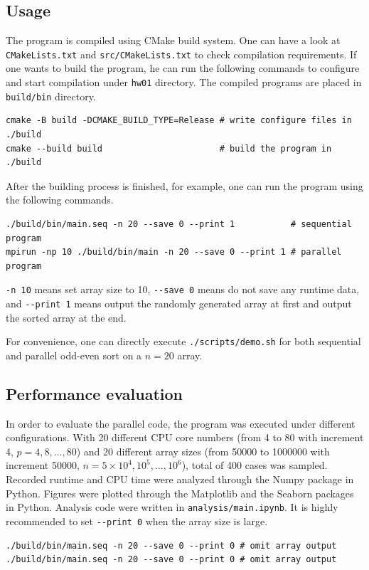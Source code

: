 \documentclass[twoside,12pt]{article}
\theoremstyle{definition}
\theoremstyle{remark}
\begin{document}
\subsection{Usage}
The program is compiled using CMake build system.
One can have a look at \lstinline|CMakeLists.txt| and \lstinline|src/CMakeLists.txt| 
to check compilation requirements.
If one wants to build the program, he can run the following commands to
configure and start compilation under \lstinline|hw01| directory.
The compiled programs are placed in \lstinline|build/bin| directory.
\begin{lstlisting}
cmake -B build -DCMAKE_BUILD_TYPE=Release # write configure files in ./build
cmake --build build                       # build the program in ./build
\end{lstlisting}
After the building process is finished, for example,
one can run the program using the following commands.
\begin{lstlisting}
./build/bin/main.seq -n 20 --save 0 --print 1           # sequential program
mpirun -np 10 ./build/bin/main -n 20 --save 0 --print 1 # parallel program 
\end{lstlisting}
\lstinline|-n 10| means set array size to 10, \lstinline|--save 0|
means do not save any runtime data, and \lstinline|--print 1|
means output the randomly generated array at first and output
the sorted array at the end.

For convenience, one can directly execute \lstinline|./scripts/demo.sh|
for both sequential and parallel odd-even sort on a $n=20$ array.


\subsection{Performance evaluation}
In order to evaluate the parallel code, the program was executed under 
different configurations.
With 20 different CPU core numbers (from 4 to 80 with increment 4, $p=4, 8,\dots, 80$)
and 20 different array sizes (from 50000 to 1000000 with increment 50000, $n=5\times 10^4, 10^5, \dots, 10^6$), 
total of 400 cases was sampled.
Recorded runtime and CPU time were analyzed through the Numpy
package in Python.
Figures were plotted through the Matplotlib and the Seaborn packages in Python.
Analysis code were written in \lstinline|analysis/main.ipynb|.
It is highly recommended to set \lstinline|--print 0| when the array size is large.
\begin{lstlisting}
./build/bin/main.seq -n 20 --save 0 --print 0 # omit array output
./build/bin/main.seq -n 20 --save 0 --print 0 # omit array output
\end{lstlisting}
\end{document}
